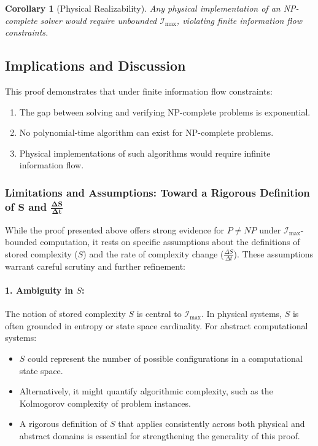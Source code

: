 \documentclass[12pt]{article}
\newtheorem{corollary}{Corollary}
\begin{document}
\begin{corollary}[Physical Realizability]
Any physical implementation of an NP-complete solver would require unbounded \(\mathcal{I}_{\text{max}}\), violating finite information flow constraints.
\end{corollary}

\subsection{Implications and Discussion}

This proof demonstrates that under finite information flow constraints:
\begin{enumerate}
    \item The gap between solving and verifying NP-complete problems is exponential.
    \item No polynomial-time algorithm can exist for NP-complete problems.
    \item Physical implementations of such algorithms would require infinite information flow.
\end{enumerate}


\subsubsection{Limitations and Assumptions: Toward a Rigorous Definition of \(\boldsymbol{S}\) and \(\boldsymbol{\frac{\Delta S}{\Delta t}}\)}

While the proof presented above offers strong evidence for \(P \neq NP\) under \(\mathcal{I}_{\text{max}}\)-bounded computation, it rests on specific assumptions about the definitions of stored complexity (\(S\)) and the rate of complexity change (\(\frac{\Delta S}{\Delta t}\)). These assumptions warrant careful scrutiny and further refinement:

\paragraph{1. Ambiguity in \(S\):}
The notion of stored complexity \(S\) is central to \(\mathcal{I}_{\text{max}}\). In physical systems, \(S\) is often grounded in entropy or state space cardinality. For abstract computational systems:
\begin{itemize}
    \item \(S\) could represent the number of possible configurations in a computational state space.
    \item Alternatively, it might quantify algorithmic complexity, such as the Kolmogorov complexity of problem instances.
    \item A rigorous definition of \(S\) that applies consistently across both physical and abstract domains is essential for strengthening the generality of this proof.
\end{itemize}
\end{document}
